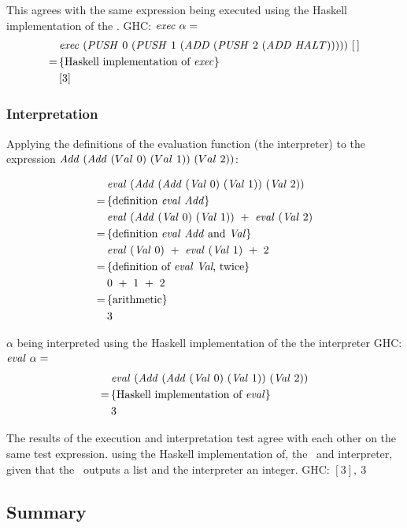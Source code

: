\documentclass {article}
\begin{document}
This agrees with the same expression being executed
using the Haskell implementation of the \vm.
GHC: \( \mathit{exec\ } \alpha =\)
\begin{align*}
&\mathit{exec\ } (\mathit{PUSH\ } 0\ (\mathit{PUSH\ } 1\ (\mathit{ADD\ }  (\mathit{PUSH\ } 2\ (\mathit{ADD\ }  \mathit{HALT})))))\ [\, ] \\
=\, & \{ \mbox{Haskell implementation of \textit{exec}} \} \\
&[3] 
\end{align*}

\subsubsection{Interpretation}

Applying the definitions of the evaluation function (the interpreter) to the expression
\( \Add (\Add (Val\ 0)\ (Val\ 1))\ (Val\ 2)) \):

\begin{align*}
	&\mathit{eval\ }  (\mathit{Add\ } (\mathit{Add\ } (\mathit{Val\ } 0)\ (\mathit{Val\ } 1))\ (\mathit{Val\ } 2)) \\
	=\, & \{ \mbox{definition \textit{eval}\ \textit{Add}} \} \\
	&\mathit{eval\ }  (\mathit{Add\ } (\mathit{Val\ } 0)\ (\mathit{Val\ } 1))\ +\ \mathit{eval\ }  (\mathit{Val\ } 2) \\
	=\, & \{ \mbox{definition \textit{eval}\ \textit{Add}\ and \textit{Val}} \} \\
	&\mathit{eval\ }  (\mathit{Val\ } 0)\ +\ \mathit{eval\ }  (\mathit{Val\ } 1)\ +\ 2 \\
	=\, & \{ \mbox{definition of \textit{eval}\ \textit{Val}, twice} \} \\
	&0\ +\ 1\ +\ 2 \\
	=\, & \{ \mbox{arithmetic} \} \\
	&3
\end{align*}

$\alpha$ being interpreted
using the Haskell implementation of the the interpreter
GHC: \( \mathit{eval\ } \alpha = \)
\begin{align*}
&\mathit{eval\ } (\mathit{Add\ } (\mathit{Add\ } (\mathit{Val\ } 0)\ (\mathit{Val\ } 1))\ (\mathit{Val\ } 2)) \\
=\, & \{ \mbox{Haskell implementation of \textit{eval}} \} \\
&3
\end{align*}

The results of the execution and interpretation test
agree with each other on the same test expression.
using the Haskell implementation of, the \vm\ and interpreter,
given that the \vm\ outputs a list and the interpreter an integer.
GHC: \( [3],\ 3 \)

\subsection{Summary}
\end{document}
